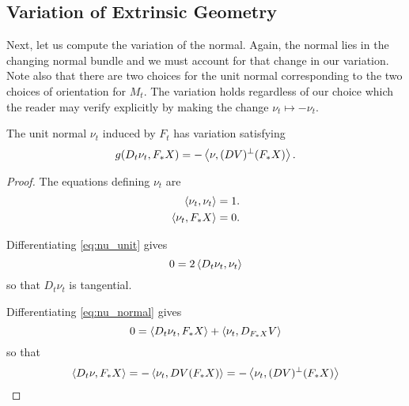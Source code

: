 \subsection*{Variation of Extrinsic Geometry}

Next, let us compute the variation of the normal. Again, the normal lies in the changing normal bundle and we must account for that change in our variation. Note also that there are two choices for the unit normal corresponding to the two choices of orientation for \(M_t\). The variation holds regardless of our choice which the reader may verify explicitly by making the change \(\nu_t \mapsto -\nu_t\).

\begin{lemma}
\label{lem:nu_t}
The unit normal \(\nu_t\) induced by \(F_t\) has variation satisfying
\[
g(D_t \nu_t, F_{\ast} X) = - \left\langle \nu,(DV)^{\perp} (F_{\ast} X) \right\rangle.
\]
\end{lemma}

\begin{proof}
The equations defining \(\nu_t\) are
\begin{align}
\label{eq:nu_unit}
\left\langle \nu_t,\nu_t \right\rangle &= 1. \\
\label{eq:nu_normal}
\left\langle \nu_t,F_{\ast} X \right\rangle &= 0.
\end{align}

Differentiating \eqref{eq:nu_unit} gives
\[
0 = 2 \left\langle D_t \nu_t,\nu_t \right\rangle
\]
so that \(D_t \nu_t\) is tangential.

Differentiating \eqref{eq:nu_normal} gives
\[
0 = \left\langle D_t \nu_t,F_{\ast} X \right\rangle + \left\langle \nu_t,D_{F_{\ast} X} V \right\rangle
\]
so that
\[
\left\langle D_t \nu,F_{\ast} X \right\rangle = - \left\langle \nu_t,DV(F_{\ast} X) \right\rangle = - \left\langle \nu_t,(DV)^{\perp}(F_{\ast} X) \right\rangle
\]
\end{proof}
